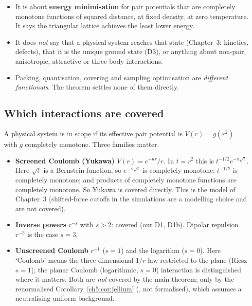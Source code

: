 \begin{warnbox}
\begin{itemize}[leftmargin=*]
\item It is about \textbf{energy minimisation} for pair potentials that are completely monotone functions of
  squared distance, at fixed density, at zero temperature. It says the triangular lattice achieves the least lower
  energy.
\item It does \emph{not} say that a physical system reaches that state (Chapter~3: kinetics, defects), that it is the
  unique ground state (D3), or anything about non-pair, anisotropic, attractive or three-body interactions.
\item Packing, quantisation, covering and sampling optimisation are \emph{different functionals}. The theorem settles
  none of them directly.
\end{itemize}
\end{warnbox}

\subsection{Which interactions are covered}

A physical system is in scope if its effective pair potential is $V(r)=g(r^2)$ with $g$ completely monotone. Three
families matter.
\begin{itemize}[leftmargin=*]
\item \textbf{Screened Coulomb (Yukawa)} $V(r)=e^{-\kappa r}/r$. In $t=r^2$ this is $t^{-1/2}e^{-\kappa\sqrt t}$. Here
  $\sqrt t$ is a Bernstein function, so $e^{-\kappa\sqrt t}$ is completely monotone; $t^{-1/2}$ is completely monotone;
  and products of completely monotone functions are completely monotone. So Yukawa is covered directly. This is the
  model of Chapter~3 (shifted-force cutoffs in the simulations are a modelling choice and are not covered).
\item \textbf{Inverse powers} $r^{-s}$ with $s>2$: covered (our D1, D1b). Dipolar repulsion $r^{-3}$ is the case $s=3$.
\item \textbf{Unscreened Coulomb} $r^{-1}$ ($s=1$) and the logarithm ($s=0$). Here `Coulomb' means the
  three-dimensional $1/r$ law restricted to the plane (Riesz $s=1$); the planar Coulomb (logarithmic, $s=0$)
  interaction is distinguished where it matters. Both are \emph{not} covered by the main theorem;
  only by the renormalised Corollary~\ref{ch5:cor:jellium} (\tierL{}, not formalised), which assumes a neutralising
  uniform background.
\end{itemize}

